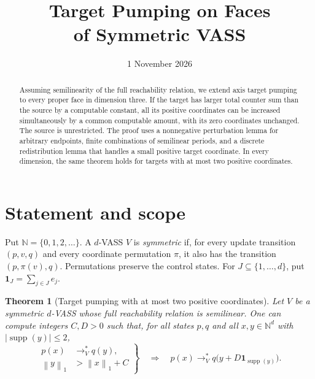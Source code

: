 \documentclass[11pt,a4paper]{article}
\title{\vspace{-13mm}\textcolor{ink}{Target Pumping on Faces\\of Symmetric VASS}}
\author{}
\date{1 November 2026}
\newtheorem{theorem}{Theorem}
\theoremstyle{remark}
\newcommand{\N}{\mathbb N}
\newcommand{\supp}{\operatorname{supp}}
\newcommand{\one}{\mathbf 1}
\newcommand{\norm}[1]{\left\lVert #1\right\rVert_1}
\newcommand{\reach}{\longrightarrow_V^*}
\begin{document}
\setlength{\abovedisplayskip}{7pt plus 2pt minus 2pt}
\setlength{\belowdisplayskip}{7pt plus 2pt minus 2pt}
\setlength{\abovedisplayshortskip}{3pt plus 1pt}
\setlength{\belowdisplayshortskip}{7pt plus 2pt minus 2pt}
\maketitle
\vspace{-10mm}
\begin{abstract}
Assuming semilinearity of the full reachability relation, we extend axis target pumping to every proper face in dimension three. If the target has larger total counter sum than the source by a computable constant, all its positive coordinates can be increased simultaneously by a common computable amount, with its zero coordinates unchanged. The source is unrestricted. The proof uses a nonnegative perturbation lemma for arbitrary endpoints, finite combinations of semilinear periods, and a discrete redistribution lemma that handles a small positive target coordinate. In every dimension, the same theorem holds for targets with at most two positive coordinates.
\end{abstract}

\section{Statement and scope}

Put $\N=\{0,1,2,\ldots\}$. A $d$-VASS $V$ is \emph{symmetric} if, for every update transition $(p,v,q)$ and every coordinate permutation $\pi$, it also has the transition $(p,\pi(v),q)$. Permutations preserve the control states. For $J\subseteq\{1,\ldots,d\}$, put $\one_J=\sum_{j\in J}e_j$.

\begin{theorem}[Target pumping with at most two positive coordinates]\label{thm:main}
Let $V$ be a symmetric $d$-VASS whose full reachability relation is semilinear. One can compute integers $C,D>0$ such that, for all states $p,q$ and all $x,y\in\N^d$ with $|\supp(y)|\le2$,
\begin{equation}\label{eq:main}
\left.
\begin{aligned}
 p(x)&\reach q(y),\\
 \norm{y}&>\norm{x}+C
\end{aligned}
\right\}
\quad\Longrightarrow\quad
 p(x)\reach q\bigl(y+D\one_{\supp(y)}\bigr).
\end{equation}
\end{theorem}
\end{document}
